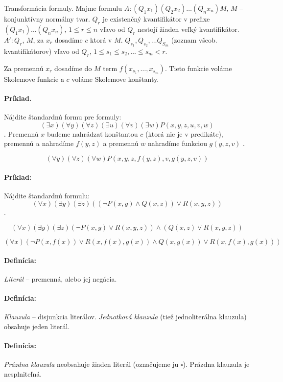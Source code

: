 Transformácia formuly. Majme formulu $A: (Q_1 x_1) (Q_2 x_2) \ldots (Q_n x_n)
M$, $M$ -- konjunktívny normálny tvar. $Q_r$ je existenčný kvantifikátor v
prefixe $(Q_1 x_1) \ldots (Q_n x_n)$, $1 \leq r \leq n$ vľavo od $Q_r$ nestojí
žiaden veľký kvantifikátor.
$A': Q_r$, $M$, za $x_r$ dosadíme $c$ ktorá v $M$.
$Q_{s_1}, Q_{s_2}, \ldots Q_{S_m}$ (zoznam všeob. kvantifikátorov) vľavo od
$Q_r$,  $1 \leq s_1 \leq s_2, \ldots \leq s_m < r$.

Za premennú $x_r$ dosadíme do $M$ term $f(x_{s_1}, \ldots, x_{s_m})$. Tieto
funkcie voláme Skolemove funkcie a $c$ voláme Skolemove konštanty.

\paragraph{Príklad.} Nájdite štandardnú formu pre formuly:
$$ (\exists x) (\forall y) (\forall z) (\exists u) (\forall v) (\exists w)
P(x,y,z,u,v,w)$$.
Premennú $x$ budeme nahrádzať konštantou $c$ (ktorá nie je v predikáte),
premennú $u$ nahradíme $f(y,z)$ a premennú $w$ nahradíme funkciou $g(y,z,v)$ .

$$ (\forall y)(\forall z)(\forall w) P(x,y,z,f(y,z),v,g(y,z,v)) $$

\paragraph{Príklad:} Nájdite štandardnú formulu: $$ (\forall x)(\exists y)
(\exists z) \left((\neg P(x,y) \land Q(x,z))\lor R(x,y,z)\right) $$.

$$ (\forall x) (\exists y) (\exists z)(\neg P(x,y) \lor R(x,y,z)) \land
(Q(x,z)\lor R(x,y,z))$$

$$ (\forall x) (\neg P(x,f(x)) \lor R(x,f(x),g(x)) \land Q(x,g(x))\lor
R(x,f(x),g(x)))$$

\paragraph{Definícia:} \emph{Literál} -- premenná, alebo jej negácia. 
\paragraph{Definícia:} \emph{Klauzula} -- disjunkcia literálov. \emph{Jednotková
klauzula} (tiež jednoliterálna klauzula) obsahuje jeden literál. 

\paragraph{Definícia:} \emph{Prázdna klauzula} neobsahuje žiaden literál
(označujeme ju $\square$). Prázdna klauzula je nesplniteľná.  

